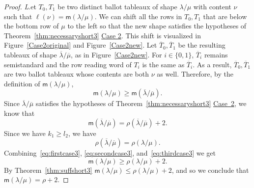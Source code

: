 \documentclass[ALCO,ThmDefs,Unicode,epreuves]{cedram}
\newcommand{\msf}{\mathsf{m}}
\let\hyperlinka\hyperlink %
\newenvironment{Case}[1]{\par\vskip2pt\noindent%
\emph{#1}.}{\vskip2pt}
\begin{document}
\begin{proof}
\begin{Case}
Let $T_0,T_1$ be two distinct ballot tableaux of shape $\lambda/\mu$ with content $\nu$ such that $\ell(\nu) = {\msf }(\lambda/\mu)$. We can shift all the rows in $T_0,T_1$ that are below the bottom row of $\mu$ to the left so that the new shape satisfies the hypotheses of Theorem~\ref{thm:necessaryshort3} \hyperlinka{theo4.6_case2}{Case 2}. This shift is visualized in Figure~\ref{Case2original} and Figure~\ref{Case2new}. Let $\overline T_0,\overline T_1$ be the resulting tableaux of shape $\overline\lambda/\overline\mu$, as in Figure~\ref{Case2new}. For $i\in \{0,1\}$, $\overline T_i$ remains semistandard and the row reading word of $T_i$ is the same as $\overline T_i$. As a result, $\overline T_0,\overline T_1$ are two ballot tableaux whose contents are both $\nu$ as well. Therefore, by the definition of ${\msf }(\lambda/\mu)$, 
\begin{equation}
\label{eq:firstcase3}
{\msf }(\lambda/\mu)\geq {\msf }(\overline\lambda/\overline\mu).
\end{equation}
Since $\overline\lambda/\overline\mu$ satisfies the hypotheses of Theorem~\ref{thm:necessaryshort3} \hyperlinka{theo4.6_case2}{Case~2}, we know that 
\begin{equation}
\label{eq:secondcase3}
{\msf }(\overline\lambda/\overline\mu) = \rho(\overline\lambda/\overline\mu) +2.
\end{equation}
Since we have $k_1\geq l_2$, we have
\begin{equation}
\label{eq:thirdcase3}
\rho(\overline\lambda/\overline\mu) = \rho(\lambda/\mu).
\end{equation}
Combining~\eqref{eq:firstcase3}, \eqref{eq:secondcase3}, and~\eqref{eq:thirdcase3} we get 
\[
{\msf }(\lambda/\mu)\geq \rho(\lambda/\mu)+2.
\]
By Theorem~\ref{thm:suffshort3} ${\msf }(\lambda/\mu)\leq \rho(\lambda/\mu)+2$, and so we conclude that ${\msf }(\lambda/\mu) = \rho+2$.


\end{Case}
\end{proof}
\end{document}
